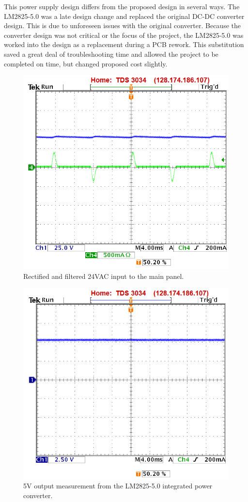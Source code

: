 This power supply design differs from the proposed design in several ways.  The LM2825-5.0 was a late design change and replaced the original DC-DC converter design.  This is due to unforeseen issues with the original converter.  Because the converter design was not critical or the focus of the project, the LM2825-5.0 was worked into the design as a replacement during a PCB rework.  This substitution saved a great deal of troubleshooting time and allowed the project to be completed on time, but changed proposed cost slightly.

\begin{figure}[htbp]
\centering
\includegraphics[width=.99\textwidth]{main_rectified_input.png}
\caption{Rectified and filtered 24VAC input to the main panel.}
\label{fig:main_rectified}
\end{figure}

\begin{figure}[htbp]
\centering
\includegraphics[width=.8\textwidth]{main_5v_output.png}
\caption{5V output measurement from the LM2825-5.0 integrated power converter.}
\label{fig:main_5v_output}
\end{figure}

